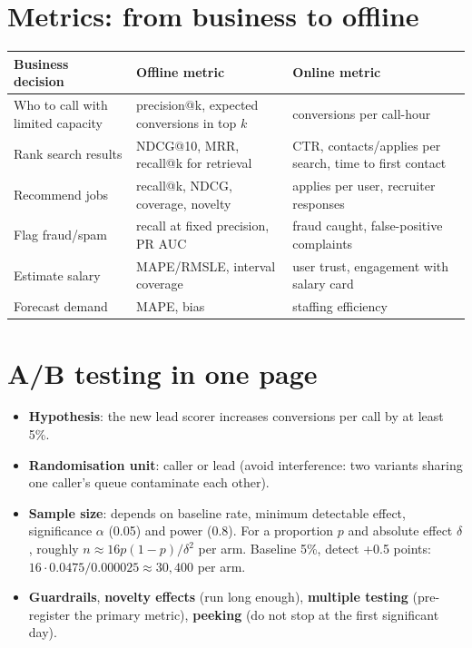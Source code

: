 \section{Metrics: from business to offline}
\begin{center}\small
\begin{tabularx}{\linewidth}{X X X}
\toprule
Business decision & Offline metric & Online metric\\
\midrule
Who to call with limited capacity & precision@k, expected conversions in top $k$ & conversions per call-hour\\
Rank search results & NDCG@10, MRR, recall@k for retrieval & CTR, contacts/applies per search, time to first contact\\
Recommend jobs & recall@k, NDCG, coverage, novelty & applies per user, recruiter responses\\
Flag fraud/spam & recall at fixed precision, PR AUC & fraud caught, false-positive complaints\\
Estimate salary & MAPE/RMSLE, interval coverage & user trust, engagement with salary card\\
Forecast demand & MAPE, bias & staffing efficiency\\
\bottomrule
\end{tabularx}
\end{center}

\section{A/B testing in one page}
\begin{itemize}
\item \textbf{Hypothesis}: the new lead scorer increases conversions per call by at least 5\%.
\item \textbf{Randomisation unit}: caller or lead (avoid interference: two variants sharing one caller's queue contaminate each other).
\item \textbf{Sample size}: depends on baseline rate, minimum detectable effect, significance $\alpha$ (0.05) and power (0.8). For a proportion $p$ and absolute effect $\delta$,
  roughly $n\approx16p(1-p)/\delta^2$ per arm. Baseline 5\%, detect +0.5 points: $16\cdot0.0475/0.000025\approx30{,}400$ per arm.
\item \textbf{Guardrails}, \textbf{novelty effects} (run long enough), \textbf{multiple testing} (pre-register the primary metric), \textbf{peeking} (do not stop at the first
  significant day).
\end{itemize}

